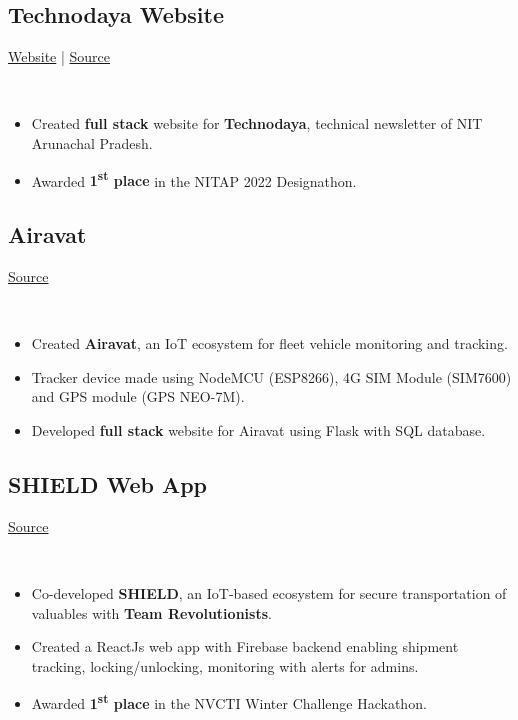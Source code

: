 \documentclass[]{article}
\newcommand{\subheading}[2]{
  {\subsection{#1}
  \hfill{#2}}\\
  \vspace{2pt}
}
\newenvironment{tightemize}{
\vspace{-4pt}
\begin{itemize}
  \itemsep3pt \parskip0pt \parsep0pt}
{\end{itemize}\vspace{-\topsep}}
\begin{document}
\begin{multicols}{2}
\begin{flushleft}
    \subheading{Technodaya Website}{
      \href{https://technodaya.netlify.app}{Website} | 
      \href{https://github.com/PursottamSah6003/Designathon-for-one}{Source}
    }
    \begin{tightemize}
      \item Created \textbf{full stack} website for \textbf{Technodaya}, technical newsletter of NIT Arunachal Pradesh.
      \item Awarded \textbf{1\textsuperscript{st} place} in the NITAP 2022 Designathon.
    \end{tightemize}

    \subheading{Airavat}{\href{https://github.com/tripathics/airavat}{Source}}
    \begin{tightemize}
      \item Created \textbf{Airavat}, an IoT ecosystem for fleet vehicle monitoring and tracking.
      \item Tracker device made using NodeMCU (ESP8266), 4G SIM Module (SIM7600) and GPS module (GPS NEO-7M).
      \item Developed \textbf{full stack} website for Airavat using Flask with SQL database.
    \end{tightemize}

    \subheading{SHIELD Web App}{\href{https://github.com/tripathics}{Source}}
    \begin{tightemize}
      \item Co-developed \textbf{SHIELD}, an IoT-based ecosystem for secure transportation of valuables with \textbf{Team Revolutionists}. 
      \item Created a ReactJs web app with Firebase backend enabling shipment tracking, locking/unlocking, monitoring with alerts for admins.
      \item Awarded \textbf{1\textsuperscript{st} place} in the NVCTI Winter Challenge Hackathon.
    \end{tightemize}


    


\end{flushleft}
\end{multicols}
\end{document}
